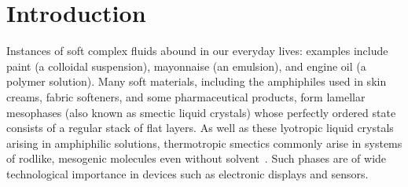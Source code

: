 \documentclass[8.5pt,twoside,twocolumn]{article}
\begin{document}





\section{Introduction}

Instances of soft complex fluids abound in our everyday lives: examples include paint (a colloidal suspension), mayonnaise (an emulsion), and engine oil (a polymer solution). Many soft materials, including the amphiphiles used in skin creams, fabric softeners, and some pharmaceutical products, form lamellar mesophases (also known as smectic liquid crystals) whose perfectly ordered state consists of a regular stack of flat layers. As well as these lyotropic liquid crystals arising in amphiphilic solutions, thermotropic smectics commonly arise in systems of rodlike, mesogenic molecules even without solvent~\cite{deGennes}. Such phases are of wide technological importance in devices
such as electronic displays and sensors.
\end{document}
